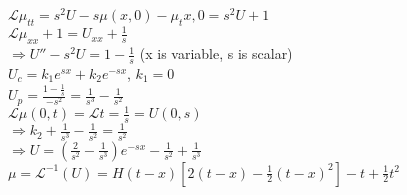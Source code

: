 \documentclass[10pt]{article}
\newcommand{\Lap}{\mathcal{L}}
\begin{document}
\begin{multicols}{2}
\begin{enumerate}
	$\Lap{\mu_{tt}} = s^2U-s\mu(x,0) - \mu_t{x,0} = s^2U + 1$\\
	$\Lap{\mu_{xx} + 1} = U_{xx} + \frac{1}{s}$\\
	$\Rightarrow U'' - s^2U = 1 - \frac{1}{s}$ (x is variable, s is scalar)\\
	$U_c = k_1e^{sx} + k_2e^{-sx}$, $k_1 = 0$\\
	$U_p = \frac{1 - \frac{1}{s}}{-s^2} = \frac{1}{s^3} - \frac{1}{s^2}$\\
	$\Lap{\mu(0,t)} = \Lap{t} = \frac{1}{s} = U(0,s)$\\
	$\Rightarrow k_2 + \frac{1}{s^3} - \frac{1}{s^2} = \frac{1}{s^2}$\\
	$\Rightarrow U = (\frac{2}{s^2} - \frac{1}{s^3})e^{-sx} - \frac{1}{s^2} + \frac{1}{s^3}$\\
	$\mu = \Lap^{-1}(U) = H(t-x)[2(t-x)-\frac{1}{2}(t-x)^2] - t + \frac{1}{2}t^2$ 
		
		
\end{enumerate}
\newpage
\end{multicols}
\end{document}
